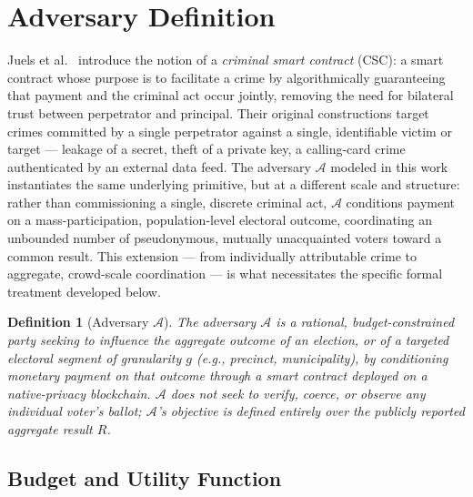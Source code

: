 \documentclass[journal,onecolumn,11pt]{IEEEtran}
\newtheorem{definition}{Definition}
\begin{document}
\section{Adversary Definition}
\label{sec:adversary}

Juels et al.~\cite{juels2016ring} introduce the notion of a \emph{criminal
smart contract} (CSC): a smart contract whose purpose is to facilitate a
crime by algorithmically guaranteeing that payment and the criminal act
occur jointly, removing the need for bilateral trust between perpetrator
and principal. Their original constructions target crimes committed by a
single perpetrator against a single, identifiable victim or target ---
leakage of a secret, theft of a private key, a calling-card crime
authenticated by an external data feed. The adversary $\mathcal{A}$
modeled in this work instantiates the same underlying primitive, but at a
different scale and structure: rather than commissioning a single,
discrete criminal act, $\mathcal{A}$ conditions payment on a
mass-participation, population-level electoral outcome, coordinating an
unbounded number of pseudonymous, mutually unacquainted voters toward a
common result. This extension --- from individually attributable crime
to aggregate, crowd-scale coordination --- is what necessitates the
specific formal treatment developed below.

\begin{definition}[Adversary $\mathcal{A}$]
\label{def:adversary}
The adversary $\mathcal{A}$ is a rational, budget-constrained party seeking to
influence the aggregate outcome of an election, or of a targeted electoral
segment of granularity $g$ (e.g., precinct, municipality), by conditioning
monetary payment on that outcome through a smart contract deployed on a
native-privacy blockchain. $\mathcal{A}$ does not seek to verify, coerce, or
observe any individual voter's ballot; $\mathcal{A}$'s objective is defined
entirely over the publicly reported aggregate result $R$.

\end{definition}

\subsection{Budget and Utility Function}
\label{subsec:budget-utility}
\end{document}
